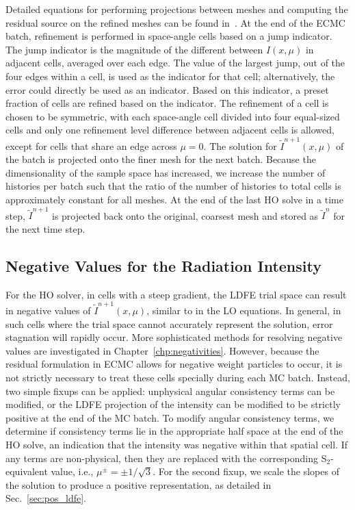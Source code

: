 Detailed equations for performing projections between meshes and computing the
residual source on the refined meshes can be found in~\cite{jake}.  At the end
of the ECMC batch, refinement is performed in space-angle cells based on a jump
indicator.  The jump indicator is the magnitude of the different between
$I(x,\mu)$ in adjacent cells, averaged over each edge.  The value of the
largest jump, out of the four edges within a cell, is used as the indicator for
that cell; alternatively, the error could directly be used as an indicator. Based on this indicator, a preset fraction of cells are refined
based on the indicator.  The refinement of a cell is chosen to be symmetric,
with each space-angle cell divided into four equal-sized cells and only one
refinement level difference between adjacent cells is allowed, except for cells
that share an edge across $\mu=0$.  The solution for $\tilde{I}^{n+1}(x,\mu)$
of the batch is projected onto the finer mesh for the next batch. Because the
dimensionality of the sample space has increased, we increase the number of
histories per batch such that the ratio of the number of histories to total
cells is approximately constant for all meshes.  At the end of the last HO
solve in a time step, $\tilde{I}^{n+1}$ is projected back onto the original,
coarsest mesh and stored as $\tilde{I}^{n}$ for the next time step.

\subsection{Negative Values for the Radiation Intensity}
\label{sec:ho_easyfix}

For the HO solver, in cells with a steep gradient, the LDFE trial space can result in
negative values of $\tilde{I}^{n+1}(x,\mu)$, similar to in the LO equations. In
general, in such cells where the trial space cannot accurately represent the solution,
error stagnation will rapidly occur.   More
sophisticated methods for resolving negative values are investigated in
Chapter~\ref{chp:negativities}.  However, because the residual formulation in ECMC allows
for negative weight particles to occur, it is not strictly necessary to treat these cells
specially during each MC batch.  Instead, two simple fixups can be applied: unphysical angular consistency terms can be
modified, or the LDFE projection of the intensity can be modified to be strictly positive
at the end of the MC batch.  To modify angular consistency terms, we determine if
consistency terms lie in the appropriate half space at the end of the HO solve, an
indication that the intensity was negative within that spatial cell.  If any terms are
non-physical, then they are replaced with the corresponding S$_2$-equivalent value, i.e.,
$\mu^{\pm}=\pm 1/\sqrt{3}$.  For the second fixup, we scale the slopes of the solution to
produce a positive representation, as detailed in Sec.~\ref{sec:pos_ldfe}.

